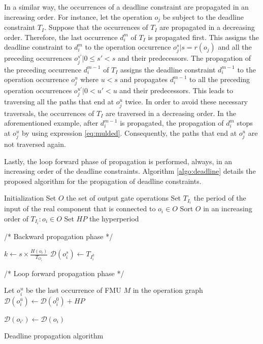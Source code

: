 In a similar way, the occurrences of a deadline constraint are propagated in an increasing order. For instance, let the operation $o_j$ be subject to the deadline constraint $T_I$. Suppose that the occurrences of $T_I$ are propagated in a decreasing order. Therefore, the last occurrence $d_i^m$ of $T_I$ is propagated first. This assigns the deadline constraint to $d_i^m$ to the operation occurrence $o_j^s | s = r(o_j)$ and all the preceding occurrences $o_j^{s'} | 0 \leq s' < s $ and their predecessors. The propagation of the preceding occurrence $d_i^{m-1}$ of $T_I$ assigns the deadline constraint $d_i^{m-1}$ to the operation occurrence $o_j^u$ where $u < s$ and propagates $d_i^{m-1}$ to all the preceding operation occurrences $o_j^{u'} | 0 < u' < u $ and their predecessors. This leads to traversing all the paths that end at $o_j^u$ twice. In order to avoid these necessary traversals, the occurrences of $T_I$ are traversed in a decreasing order. In the aforementioned example, after $d_i^{m-1}$ is propagated, the propagation of $d_i^m$ stops at $o_j^u$ by using expression \ref{eq:mulded}. Consequently, the paths that end at $o_j^u$ are not traversed again.

Lastly, the loop forward phase of propagation is performed, always, in an increasing order of the deadline constraints. Algorithm \ref{algo:deadline} details the proposed algorithm for the propagation of deadline constraints.

\begin{algorithm}[!htp]	
	 Initialization\;
	 Set $O$ the set of output gate operations\;
	 Set $T_{I_i}$ the period of the input of the real component that is connected to $o_i \in O$\;
	 Sort $O$ in an increasing order of $T_{I_i}: o_i \in O$\;
	 Set $HP$ the hyperperiod\;
	
	/* Backward propagation phase */
	
	{
		{
		  $k \leftarrow s \times \frac{H(o_i)}{T_{O_i}}$\;
			$\mathcal{D}(o_i^s) \leftarrow T_{I_i^k}$\;
			\;	
		}
	}
	
	/* Loop forward propagation phase */
	
	{
		  Let $o_i^u$ be the last occurrence of FMU $M$ in the operation graph\;
			$\mathcal{D}(o_i^u) \leftarrow \mathcal{D}(o_i^0) + HP$\;
			\;	
	}
		
		{
			{
				{
					$\mathcal{D}(o_{i'}) \leftarrow \mathcal{D}(o_i)$\;
					\;
				}
			}
			\KwRet\;
		}
	\caption{Deadline propagation algorithm}
	\label{algo:deadline}
\end{algorithm}   

